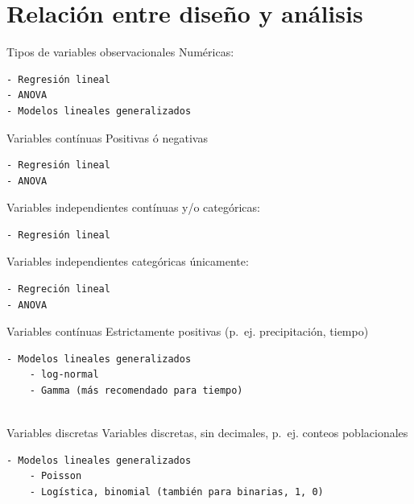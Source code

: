 \documentclass[
  11pt,
  ignorenonframetext,
]{beamer}
\begin{document}
\hypertarget{relaciuxf3n-entre-diseuxf1o-y-anuxe1lisis}{%
\section{Relación entre diseño y
análisis}\label{relaciuxf3n-entre-diseuxf1o-y-anuxe1lisis}}

\begin{frame}[fragile]{Tipos de variables observacionales}
\protect\hypertarget{tipos-de-variables-observacionales}{}
Numéricas:

\begin{verbatim}
- Regresión lineal
- ANOVA
- Modelos lineales generalizados
\end{verbatim}
\end{frame}

\begin{frame}[fragile]{Variables contínuas}
\protect\hypertarget{variables-contuxednuas}{}
Positivas ó negativas

\begin{verbatim}
- Regresión lineal
- ANOVA
\end{verbatim}

Variables independientes contínuas y/o categóricas:

\begin{verbatim}
- Regresión lineal
\end{verbatim}

Variables independientes categóricas únicamente:

\begin{verbatim}
- Regreción lineal
- ANOVA
\end{verbatim}
\end{frame}

\begin{frame}[fragile]{Variables contínuas}
\protect\hypertarget{variables-contuxednuas-1}{}
Estrictamente positivas (p.~ej. precipitación, tiempo)

\begin{verbatim}
- Modelos lineales generalizados
    - log-normal
    - Gamma (más recomendado para tiempo)
    
\end{verbatim}
\end{frame}

\begin{frame}[fragile]{Variables discretas}
\protect\hypertarget{variables-discretas}{}
Variables discretas, sin decimales, p.~ej. conteos poblacionales

\begin{verbatim}
- Modelos lineales generalizados
    - Poisson
    - Logística, binomial (también para binarias, 1, 0)
\end{verbatim}
\end{frame}
\end{document}
